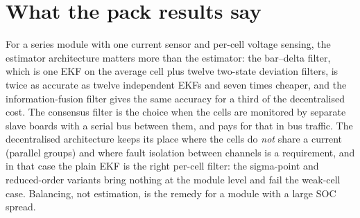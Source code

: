 \section{What the pack results say}

For a series module with one current sensor and per-cell voltage sensing, the estimator
architecture matters more than the estimator: the bar--delta filter, which is one EKF on the
average cell plus twelve two-state deviation filters, is twice as accurate as twelve independent EKFs and
seven times cheaper, and the information-fusion filter gives the same accuracy for a third
of the decentralised cost. The consensus filter is the choice when the cells are monitored
by separate slave boards with a serial bus between them, and pays for that in bus traffic.
The decentralised architecture keeps its place where the cells do \emph{not} share a current
(parallel groups) and where fault isolation between channels is a requirement, and in that
case the plain EKF is the right per-cell filter: the sigma-point and reduced-order variants
bring nothing at the module level and fail the weak-cell case. Balancing, not estimation, is
the remedy for a module with a large SOC spread.
